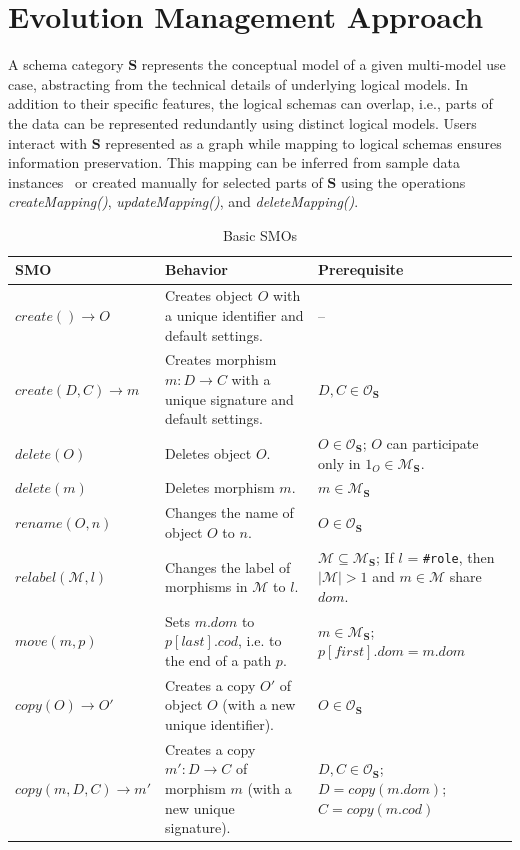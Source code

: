 \section{Evolution Management Approach}

A schema category $\mathbf{S}$ represents the conceptual model of a given multi-model use case, abstracting from the technical details of underlying logical models. In addition to their specific features, the logical schemas can overlap, i.e., parts of the data can be represented redundantly using distinct logical models. Users interact with $\mathbf{S}$ represented as a graph while mapping to logical schemas ensures information preservation. This mapping can be inferred from sample data instances~\citep{koupil2022mminfer} or created manually for selected parts of $\mathbf{S}$ using the operations \textit{createMapping()}, \textit{updateMapping()}, and \textit{deleteMapping()}.

\begin{table}[!b]
\centering
\caption{Basic SMOs}
\scriptsize
\def\arraystretch{1.40}
\begin{tabular}{    
    l
    >{\raggedright\arraybackslash}p{55mm}
    >{\raggedright\arraybackslash}p{40mm}
    }
\toprule
\textbf{SMO}  & \textbf{Behavior}  & \textbf{Prerequisite} \\
\midrule
$create() \rightarrow O$ & Creates object $O$ with a unique identifier and default settings. & -- \\
$create(D, C) \rightarrow m$ &  Creates morphism $m: D \rightarrow C$ with a unique signature and default settings. & $D,C \in \mathcal{O}_{\mathbf{S}}$ \\
$delete(O)$   & Deletes object $O$.    & $O \in \mathcal{O}_{\mathbf{S}}$; $O$ can participate only in $1_O \in \mathcal{M}_{\mathbf{S}}$.  \\
$delete(m)$   & Deletes morphism $m$.    & $m \in \mathcal{M}_{\mathbf{S}}$  \\
$rename(O, n)$   &  Changes the name of object $O$ to $n$.   & $O \in \mathcal{O}_{\mathbf{S}}$  \\
$relabel(\mathcal{M}, l)$   &  Changes the label of morphisms in $\mathcal{M}$ to $l$.   & $\mathcal{M} \subseteq \mathcal{M}_{\mathbf{S}}$; If $l$ = \texttt{\#role}, then $|\mathcal{M}| > 1$ and $m \in \mathcal{M}$ share $dom$.    \\
$move(m, p)$   &  Sets $m.dom$ to  $p[last].cod$, i.e. to the end of a path $p$.  & $m \in \mathcal{M}_{\mathbf{S}}$; $p[first].dom = m.dom$  \\
$copy(O) \rightarrow O'$   &  Creates a copy $O'$ of object $O$ (with a new unique identifier).  &  $O \in \mathcal{O}_{\mathbf{S}}$ \\
$copy(m, D, C)\rightarrow m'$   &  Creates a copy $m' : D \rightarrow C$ of morphism $m$ (with a new unique signature). & $D,C \in \mathcal{O}_{\mathbf{S}}$; $D = copy(m.dom)$; $C = copy(m.cod)$  \\
\bottomrule
\end{tabular}
\end{table}


